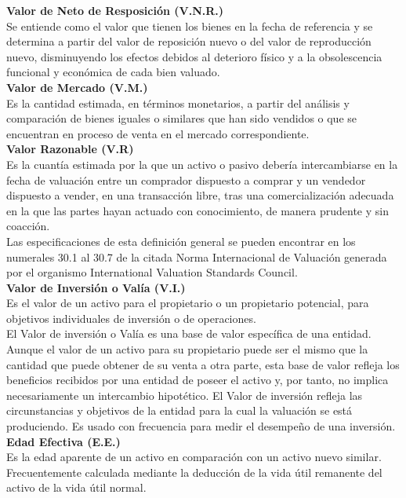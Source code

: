 \textbf{Valor de Neto de Resposición (V.N.R.)} \\ 
Se entiende como el valor que tienen los bienes en la fecha de referencia y se determina a partir del valor de reposición nuevo o del valor de reproducción nuevo, disminuyendo los efectos debidos al deterioro físico y a la obsolescencia funcional y económica de cada bien valuado. \\[6mm] 
\textbf{Valor de Mercado (V.M.)} \\ 
Es la cantidad estimada, en términos monetarios, a partir del análisis y comparación de bienes iguales o similares que han sido vendidos o que se encuentran en proceso de venta en el mercado correspondiente. \\[6mm]
\textbf{Valor Razonable (V.R)} \\ 
Es la cuantía estimada por la que un activo o pasivo debería intercambiarse en la fecha de valuación entre un comprador dispuesto a comprar y un vendedor dispuesto a vender, en una transacción libre, tras una comercialización adecuada en la que las partes hayan actuado con conocimiento, de manera prudente y sin coacción. \\ 
Las especificaciones de esta definición general se pueden encontrar en los numerales 30.1 al 30.7 de la citada Norma Internacional de Valuación generada por el organismo International Valuation Standards Council. \\[6mm] 
\textbf{Valor de Inversión o Valía (V.I.)} \\ 
Es el valor de un activo para el propietario o un propietario potencial, para objetivos individuales de inversión o de operaciones. \\ 
El Valor de inversión o Valía es una base de valor específica de una entidad. 
Aunque el valor de un activo para su propietario puede ser el mismo que la cantidad que puede obtener de su venta a otra parte, esta base de valor refleja los beneficios recibidos por una entidad de poseer el activo y, por tanto, no implica necesariamente un intercambio hipotético. 
El Valor de inversión refleja las circunstancias y objetivos de la entidad para la cual la valuación se está produciendo. 
Es usado con frecuencia para medir el desempeño de una inversión. \\[6mm] 
\textbf{Edad Efectiva (E.E.)} \\ 
Es la edad aparente de un activo en comparación con un activo nuevo similar. Frecuentemente calculada mediante la deducción de la vida útil remanente del activo de la vida útil normal. \\[6mm]
